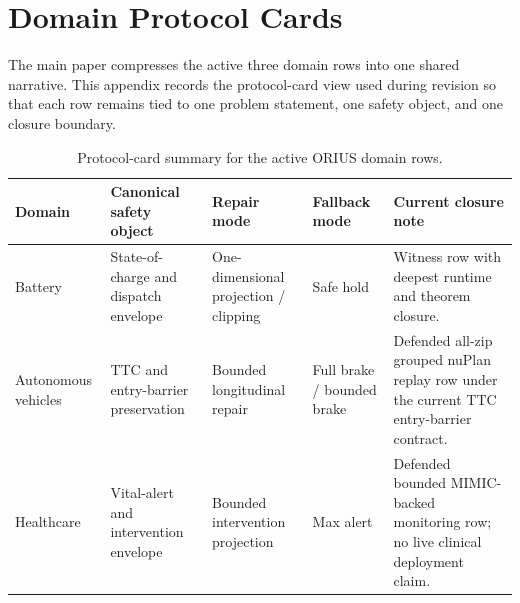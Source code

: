 \section{Domain Protocol Cards}
\label{sec:ieee-app-protocols}

The main paper compresses the active three domain rows into one shared narrative. This appendix
records the protocol-card view used during revision so that each row remains tied to one
problem statement, one safety object, and one closure boundary.

\begin{table}[h]
\centering
\caption{Protocol-card summary for the active ORIUS domain rows.}
\label{tab:ieee-appendix-protocols}
\small
\begin{tabularx}{\textwidth}{@{}p{}p{}p{}p{}p{}@{}}
\toprule
\textbf{Domain} & \textbf{Canonical safety object} & \textbf{Repair mode} & \textbf{Fallback mode} & \textbf{Current closure note}\\
\midrule
Battery & State-of-charge and dispatch envelope & One-dimensional projection / clipping & Safe hold & Witness row with deepest runtime and theorem closure.\\
Autonomous vehicles & TTC and entry-barrier preservation & Bounded longitudinal repair & Full brake / bounded brake & Defended all-zip grouped nuPlan replay row under the current TTC entry-barrier contract.\\
Healthcare & Vital-alert and intervention envelope & Bounded intervention projection & Max alert & Defended bounded MIMIC-backed monitoring row; no live clinical deployment claim.\\
\bottomrule
\end{tabularx}
\end{table}
